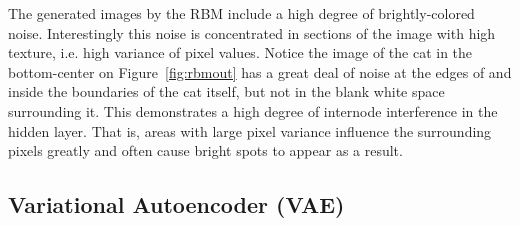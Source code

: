 \documentclass[%
 reprint,
 amsmath,amssymb,
 aps,
]{revtex4-2}
\begin{document}
The generated images by the RBM include a high degree of brightly-colored noise. Interestingly this noise is concentrated in sections of the image with high texture, i.e. high variance of pixel values. Notice the image of the cat in the bottom-center on Figure~\ref{fig:rbmout} has a great deal of noise at the edges of and inside the boundaries of the cat itself, but not in the blank white space surrounding it. This demonstrates a high degree of internode interference in the hidden layer. That is, areas with large pixel variance influence the surrounding pixels greatly and often cause bright spots to appear as a result.

\subsection{Variational Autoencoder (VAE)}
\end{document}
